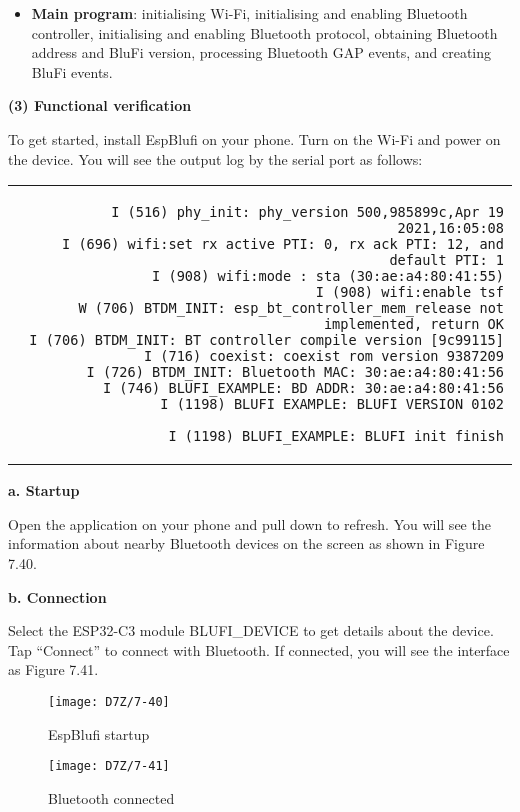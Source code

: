 \documentclass[a4paper,12pt]{book}
\begin{document}
\begin{itemize}[leftmargin=1.5em]
    \item \textbf{Main program}: initialising Wi-Fi, initialising and enabling Bluetooth controller, initialising and enabling Bluetooth protocol, obtaining Bluetooth address and BluFi version, processing Bluetooth GAP events, and creating BluFi events.
\end{itemize}

\textbf{(3) Functional verification}

To get started, install EspBlufi on your phone. Turn on the Wi-Fi and power on the device. You will see the output log by the serial port as follows:

\begin{codebloc}
\fontsize{10pt}{10pt}\selectfont
\begin{tabular}{d}
\vspace{2pt}
\begin{verbatim}
I (516) phy_init: phy_version 500,985899c,Apr 19 2021,16:05:08
I (696) wifi:set rx active PTI: 0, rx ack PTI: 12, and default PTI: 1
I (908) wifi:mode : sta (30:ae:a4:80:41:55)
I (908) wifi:enable tsf
W (706) BTDM_INIT: esp_bt_controller_mem_release not implemented, return OK
I (706) BTDM_INIT: BT controller compile version [9c99115]
I (716) coexist: coexist rom version 9387209
I (726) BTDM_INIT: Bluetooth MAC: 30:ae:a4:80:41:56
I (746) BLUFI_EXAMPLE: BD ADDR: 30:ae:a4:80:41:56
I (1198) BLUFI_EXAMPLE: BLUFI VERSION 0102
\end{verbatim}
\verb|I (1198) BLUFI_EXAMPLE: BLUFI init finish|
\end{tabular}
\end{codebloc}


\textbf{a. Startup}

Open the application on your phone and pull down to refresh. You will see the information about nearby Bluetooth devices on the screen as shown in Figure 7.40.

\textbf{b. Connection}

Select the ESP32-C3 module BLUFI\_DEVICE to get details about the device. Tap “Connect” to connect with Bluetooth. If connected, you will see the interface as Figure 7.41.

\begin{figure}[!h]
  \Centering
  \begin{minipage}[b]{0.4\textwidth}
    \texttt{[image: D7Z/7-40]}
    \caption{EspBlufi startup}
  \end{minipage}\hspace{2em}
  \begin{minipage}[b]{0.4\textwidth}
    \texttt{[image: D7Z/7-41]}
    \caption{Bluetooth connected}
  \end{minipage}
\end{figure}
\end{document}

